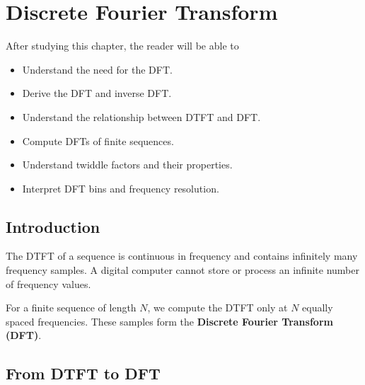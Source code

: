 
\chapter{Discrete Fourier Transform}

\begin{tcolorbox}[colback=blue!5!white,colframe=blue!70!black,title=Learning Objectives]

After studying this chapter, the reader will be able to

\begin{itemize}
\item Understand the need for the DFT.
\item Derive the DFT and inverse DFT.
\item Understand the relationship between DTFT and DFT.
\item Compute DFTs of finite sequences.
\item Understand twiddle factors and their properties.
\item Interpret DFT bins and frequency resolution.
\end{itemize}

\end{tcolorbox}


\section{Introduction}

The DTFT of a sequence is continuous in frequency and contains infinitely many
frequency samples. A digital computer cannot store or process an infinite number
of frequency values.

For a finite sequence of length \(N\), we compute the DTFT only at \(N\)
equally spaced frequencies. These samples form the
\textbf{Discrete Fourier Transform (DFT)}.


\section{From DTFT to DFT}

